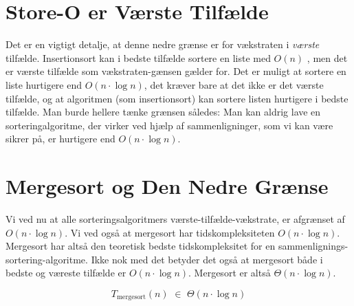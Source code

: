 \section{Store-O er Værste Tilfælde}
\label{sec:Store-O er Værste Tilfælde}

Det er en vigtigt detalje, at denne nedre grænse er for vækstraten i \emph{værste} tilfælde. Insertionsort kan i bedste tilfælde sortere en liste med $O(n)$ \cite{big-o-cheatsheet}, men det er værste tilfælde som vækstraten-gænsen gælder for. Det er muligt at sortere en liste hurtigere end $O(n \cdot \log n)$, det kræver bare at det ikke er det værste tilfælde, og at algoritmen (som insertionsort) kan sortere listen hurtigere i bedste tilfælde. Man burde hellere tænke grænsen således: Man kan aldrig lave en sorteringalgoritme, der virker ved hjælp af sammenligninger, som vi kan være sikrer på, er hurtigere end $O(n \cdot \log n)$.

\section{Mergesort og Den Nedre Grænse}
\label{sec:Mergesort og Den Nedre Grænse}

Vi ved nu at alle sorteringsalgoritmers værste-tilfælde-vækstrate, er afgrænset af $O(n \cdot \log n)$. Vi ved også at mergesort har tidskompleksiteten $O (n \cdot \log n)$. Mergesort har altså den teoretisk bedste tidskompleksitet for en sammenlignings-sortering-algoritme. Ikke nok med det betyder det også at mergesort både i bedste og væreste tilfælde er $O(n \cdot \log n)$. Mergesort er altså $\Theta (n \cdot \log n)$.


$$T_{\text{mergesort}}(n) \,\,\in\,\, \Theta (n \cdot \log n)$$






